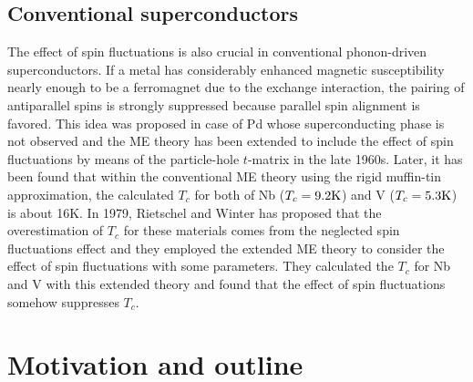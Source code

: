\subsection{Conventional superconductors}
The effect of spin fluctuations is also crucial in conventional phonon-driven superconductors.
If a metal has considerably enhanced magnetic susceptibility nearly enough to be a ferromagnet
due to the exchange interaction, the pairing of antiparallel spins is strongly suppressed because
parallel spin alignment is favored. This idea was proposed in case of Pd whose superconducting phase
is not observed\cite{Parks1969} and the ME theory has been extended to include the effect of spin 
fluctuations by means of the particle-hole $t$-matrix in the late 1960s\cite{Berk1966, Schrieffer1968}.
Later, it has been found that within the conventional ME theory using the rigid muffin-tin approximation, 
the calculated $T_c$ for both of Nb 
($T_c = 9.2 \rm K$) and V ($T_c = 5.3 \rm K$) is about 16K\cite{Papa1977}.
In 1979, Rietschel and Winter\cite{Rietschel1979} has proposed that the overestimation of $T_c$ for 
these materials comes from the neglected spin fluctuations effect and they employed the extended ME 
theory to consider the effect of spin fluctuations with some parameters. They calculated the $T_c$ 
for Nb and V with this extended theory and found that the effect of spin fluctuations somehow suppresses $T_c$. 

\section{Motivation and outline}

